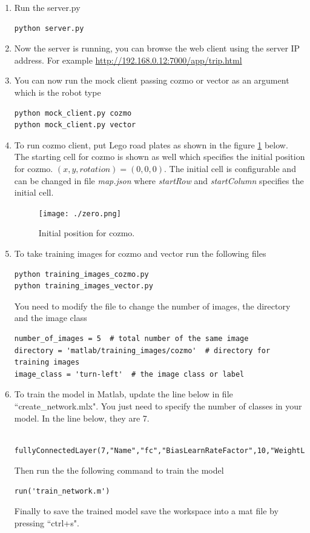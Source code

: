 \documentclass[12pt,a4paper]{article}
\begin{document}
\begin{enumerate}
\item Run the server.py 
\begin{verbatim}
python server.py
\end{verbatim}

\item Now the server is running, you can browse the web client using the server IP address. For example \url{http://192.168.0.12:7000/app/trip.html}
\item You can now run the mock client passing cozmo or vector as an argument which is the robot type
\begin{verbatim}
python mock_client.py cozmo
python mock_client.py vector
\end{verbatim}

\item To run cozmo client, put Lego road plates as shown in the figure \ref{fig:zero} below. The starting cell for cozmo is shown as well which specifies the initial position for cozmo. $(x, y, rotation) = (0,0, 0)$. The initial cell is configurable and can be changed in file \textit{map.json} where \textit{startRow}  and \textit{startColumn} specifies the initial cell.

\begin{figure}[H]
\center
\texttt{[image: ./zero.png]}
\caption{Initial position for cozmo. } \label{fig:zero}
\end{figure}


\item To take training images for cozmo and vector run the following files
\begin{verbatim}
python training_images_cozmo.py
python training_images_vector.py
\end{verbatim}

You need to modify the file to change the number of images, the directory and the image class

\begin{verbatim}
number_of_images = 5  # total number of the same image
directory = 'matlab/training_images/cozmo'  # directory for training images
image_class = 'turn-left'  # the image class or label
\end{verbatim}

\item To train the model in Matlab, update the line below in file ``create\_network.mlx". You just need to specify the number of classes in your model. In the line below, they are 7. 
\footnotesize
\begin{verbatim}
 fullyConnectedLayer(7,"Name","fc","BiasLearnRateFactor",10,"WeightLearnRateFactor",10)
\end{verbatim}
\normalsize
Then run the the following command to train the model 
\begin{verbatim}
run('train_network.m')
\end{verbatim}
Finally to save the trained model save the workspace into a mat file by pressing ``ctrl+s".
\end{enumerate}
\end{document}
